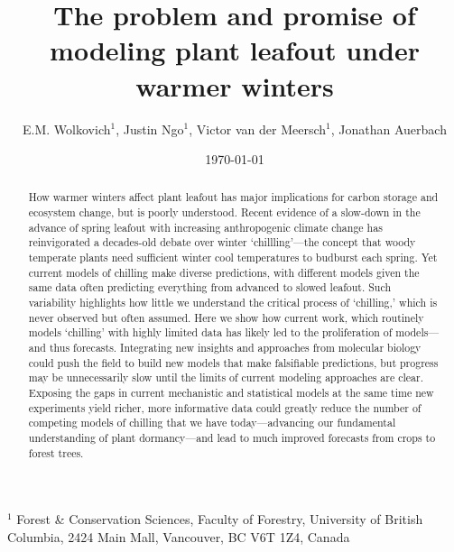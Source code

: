 \documentclass[11pt]{article}
\begin{document}
\renewcommand{\refname}{\CHead{}}


\title{The problem and promise of \\ modeling plant leafout under warmer winters} %
\author{E.M. Wolkovich$^1$, Justin Ngo$^1$, Victor van der Meersch$^1$, Jonathan Auerbach} %
\date{\today}
\maketitle

$^1$ Forest \& Conservation Sciences, Faculty of Forestry, University of British Columbia, 2424 Main Mall, Vancouver, BC V6T 1Z4, Canada\\


\begin{abstract} %
How warmer winters affect plant leafout has major implications for carbon storage and ecosystem change, but is poorly understood. 
Recent evidence of a slow-down in the advance of spring leafout with increasing anthropogenic climate change has reinvigorated a decades-old debate over winter `chillling'---the concept that woody temperate plants need sufficient winter cool temperatures to budburst each spring. Yet current models of chilling make diverse predictions, with different models given the same data often predicting everything from advanced to slowed leafout. Such variability highlights how little we understand the critical process of `chilling,' which is never observed but often assumed. Here we show how current work, which routinely models `chilling' with highly limited data has likely led to the proliferation of models---and thus forecasts. Integrating new insights and approaches from molecular biology could push the field to build new models that make falsifiable predictions, but  progress may be unnecessarily slow until the limits of current modeling approaches are clear. Exposing the gaps in current mechanistic and statistical models at the same time new experiments yield richer, more informative data could greatly reduce the number of competing models of chilling that we have today---advancing our fundamental understanding of plant dormancy---and lead to much improved forecasts from crops to forest trees. 
\end{abstract}
\end{document}
